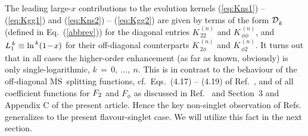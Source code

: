 \documentclass[12pt]{article}
\newcommand{\MSb}{$\overline{\mbox{MS}}$}
\begin{document}
The leading large-$x$ contributions to the evolution kernels (\ref{eq:Kns1})
-- (\ref{eq:Kgg1}) and (\ref{eq:Kns2}) -- (\ref{eq:Kgg2}) are given by terms
of the form ${{\cal D}_{\:\! k}^{}}$ (defined in Eq.~(\ref{abbrev})) for the diagonal 
entries $K^{\,(n)}_{\,22}$ and $K^{\,(n)}_{\,\phi\phi}$, and $L_1^{\,k} \equiv 
\ln^{\,k} \! \x1$ for their off-diagonal counterparts $K^{\,(n)}_{\,2\phi}$
and $K^{\,(n)}_{\,\phi 2 }$. It turns out that in all cases the higher-order
enhancement (as far as known, obviously) is only single-logarithmic, $k \,=\,
0,\: \ldots,\: n$. This is in contrast to the behaviour of the off-diagonal 
\MSb\ splitting functions, cf.~Eqs.~(4.17) -- (4.19) of Ref.~\cite{MVV4}, and
of all coefficient functions for ${F_{\:\! 2}}$ and $F_\phi$ as discussed in 
Ref.~\cite{MVV6} and Section~3 and Appendix C of the present article. Hence the
key non-singlet observation of Refs.\mbox{\cite{MV3,MV5}} generalizes to the 
present flavour-singlet case. We will utilize this fact in the next section.
\end{document}
